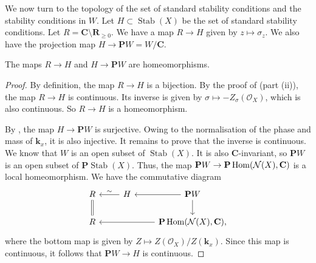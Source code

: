 \documentclass{amsart}
\begin{document}
We now turn to the topology of the set of standard stability conditions and the stability conditions in \(W\).
Let \(H \subset \operatorname{Stab}(X)\) be the set of standard stability conditions.
Let \(R = \mathbf{C} \setminus \mathbf{R}_{\geq 0}\).
We have a map \(R \to H\) given by \(z \mapsto \sigma_z\).
We also have the projection map \(H \to \mathbf{P}W = W/ \mathbf{C}\).
\begin{proposition}\label{prop:chart}
 The maps \(R \to H\) and \(H \to \mathbf{P} W\) are homeomorphisms.
\end{proposition}
\begin{proof}
  By definition, the map \(R \to H\) is a bijection.
  By the proof of \cite[Theorem~4.8]{huy.mac.ste:08} (part (ii)), the map \(R \to H\) is continuous.
  Its inverse is given by \(\sigma \mapsto -Z_{\sigma}(\mathcal{O}_{X})\), which is also continuous.
  So \(R \to H\) is a homeomorphism.

  By , the map \(H \to \mathbf{P} W\) is surjective.
  Owing to the normalisation of the phase and mass of \(\mathbf{k}_x\), it is also injective.
  It remains to prove that the inverse is continuous.
  We know that \(W\) is an open subset of \(\operatorname{Stab}(X)\).
  It is also \(\mathbf{C}\)-invariant, so \(\mathbf{P} W\) is an open subset of \(\mathbf{P} \operatorname{Stab}(X)\).
  Thus, the map \(\mathbf{P} W \to \mathbf{P} \operatorname{Hom}(\mathcal{N}(X), \mathbf{C})\) is a local homeomorphism.
  We have the commutative diagram
  \[
    \begin{tikzcd}
      R\ar[equal]{d} & H \ar{l}[above]{\sim} & \mathbf{P} W\ar{l}\ar{d} \\
      R & & \mathbf{P} \Hom(\mathcal{N}(X), \mathbf{C})\ar{ll},
    \end{tikzcd}
  \]
  where the bottom map is given by \(Z \mapsto  Z(\mathcal{O}_X)/Z(\mathbf{k}_x)\).
  Since this map is continuous, it follows that \(\mathbf{P} W \to H\) is continuous.
\end{proof}
\end{document}

